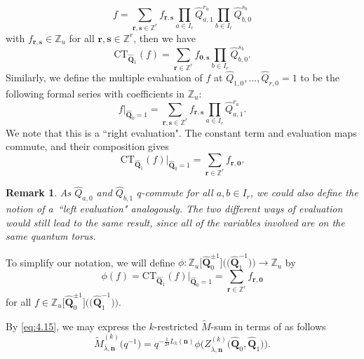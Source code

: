 \documentclass[10pt,a4paper]{amsart}
\numberwithin{equation}{section}
\newtheorem*{remark*}{Remark}
\begin{document}
\begin{equation*}
f=\sum_{\mathbf{r},\mathbf{s}\in\mathbb{Z}^r}f_{\mathbf{r},\mathbf{s}}\prod_{a\in I_r}\widehat{Q}_{a,1}^{r_a}\prod_{b\in I_r}\widehat{Q}_{b,0}^{s_b}
\end{equation*}
with $f_{\mathbf{r},\mathbf{s}}\in\mathbb{Z}_u$ for all $\mathbf{r},\mathbf{s}\in\mathbb{Z}^r$, then we have
\begin{equation*}
\mathrm{CT}_{\widehat{\mathbf{Q}}_1}(f)=\sum_{\mathbf{r}\in\mathbb{Z}^r}f_{\mathbf{0},\mathbf{s}}\prod_{b\in I_r}\widehat{Q}_{b,0}^{s_b}.
\end{equation*}
Similarly, we define the multiple evaluation of $f$ at $\widehat{Q}_{1,0},\dots,\widehat{Q}_{r,0}=1$ to be the following formal series with coefficients in $\mathbb{Z}_u$:
\begin{equation*}
f|_{\widehat{\mathbf{Q}}_0=1}=\sum_{\mathbf{r},\mathbf{s}\in\mathbb{Z}^r}f_{\mathbf{r},\mathbf{s}}\prod_{a\in I_r}\widehat{Q}_{a,1}^{r_a}.
\end{equation*}
We note that this is a ``right evaluation". The constant term and evaluation maps commute, and their composition gives
\begin{equation*}
\mathrm{CT}_{\widehat{\mathbf{Q}}_1}(f)|_{\widehat{\mathbf{Q}}_0=1}=\sum_{\mathbf{r}\in\mathbb{Z}^r}f_{\mathbf{r},\mathbf{0}}.
\end{equation*}

\begin{remark*}
As $\widehat{Q}_{a,0}$ and $\widehat{Q}_{b,1}$ $q$-commute for all $a,b\in I_r$, we could also define the notion of a~``left evaluation" analogously. The two different ways of evaluation would still lead to the same result, since all of the variables involved are on the same quantum torus.
\end{remark*}

To simplify our notation, we will define $\phi\colon \mathbb{Z}_u\bigl[\widehat{\mathbf{Q}}_0^{\pm1}\bigr]\bigl(\bigl(\widehat{\mathbf{Q}}_1^{-1}\bigr)\bigr)\to\mathbb{Z}_u$ by
\begin{equation*}
\phi(f)
=\mathrm{CT}_{\widehat{\mathbf{Q}}_1}(f)|_{\widehat{\mathbf{Q}}_0=1}
=\sum_{\mathbf{r}\in\mathbb{Z}^r}f_{\mathbf{r},\mathbf{0}}
\end{equation*}
for all $f\in\mathbb{Z}_u\bigl[\widehat{\mathbf{Q}}_0^{\pm1}\bigr]\bigl(\bigl(\widehat{\mathbf{Q}}_1^{-1}\bigr)\bigr)$.

By \eqref{eq:4.15}, we may express the $k$-restricted $\tilde{M}$-sum  in terms of  as follows
\begin{equation}
\tilde{M}_{\overline{\lambda},\mathbf{n}}^{(k)}\bigl(q^{-1}\bigr)
=q^{-\frac{1}{2\delta}L_k(\mathbf{n})}\phi\bigl(Z_{\overline{ \lambda},\mathbf{n}}^{(k)}\bigl(\widehat{\mathbf{Q}}_0,\widehat{ \mathbf{Q}}_1\bigr)\bigr).\label{eq:4.16}
\end{equation}
\end{document}

